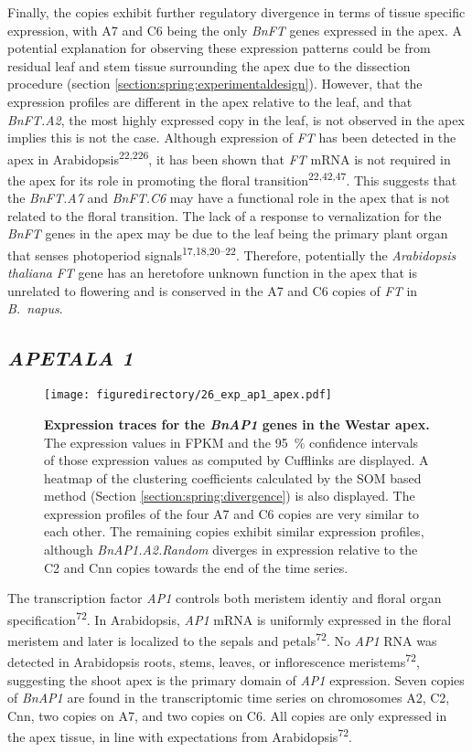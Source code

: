 \documentclass[12pt,]{book}
\begin{document}
Finally, the copies exhibit further regulatory divergence in terms of
tissue specific expression, with A7 and C6 being the only \emph{BnFT}
genes expressed in the apex. A potential explanation for observing these
expression patterns could be from residual leaf and stem tissue
surrounding the apex due to the dissection procedure (section
\ref{section:spring:experimentaldesign}). However, that the expression
profiles are different in the apex relative to the leaf, and that
\emph{BnFT.A2}, the most highly expressed copy in the leaf, is not
observed in the apex implies this is not the case. Although expression
of \emph{FT} has been detected in the apex in
Arabidopsis\textsuperscript{22,226}, it has been shown that \emph{FT}
mRNA is not required in the apex for its role in promoting the floral
transition\textsuperscript{22,42,47}. This suggests that the
\emph{BnFT.A7} and \emph{BnFT.C6} may have a functional role in the apex
that is not related to the floral transition. The lack of a response to
vernalization for the \emph{BnFT} genes in the apex may be due to the
leaf being the primary plant organ that senses photoperiod
signals\textsuperscript{17,18,20--22}. Therefore, potentially the
\emph{Arabidopsis thaliana} \emph{FT} gene has an heretofore unknown
function in the apex that is unrelated to flowering and is conserved in
the A7 and C6 copies of \emph{FT} in \emph{B.~napus}.

\subsection{\texorpdfstring{\emph{APETALA
1}}{APETALA 1}}\label{section:spring:ap1}

\begin{figure}[htbp]
\centering
\texttt{[image: figuredirectory/26\_exp\_ap1\_apex.pdf]}
\caption{\textbf{Expression traces for the \emph{BnAP1} genes in the
Westar apex.} The expression values in FPKM and the 95~\% confidence
intervals of those expression values as computed by Cufflinks are
displayed. A heatmap of the clustering coefficients calculated by the
SOM based method (Section \ref{section:spring:divergence}) is also
displayed. The expression profiles of the four A7 and C6 copies are very
similar to each other. The remaining copies exhibit similar expression
profiles, although \emph{BnAP1.A2.Random} diverges in expression
relative to the C2 and Cnn copies towards the end of the time
series.}\label{figure:226:ap1apex}
\end{figure}

The transcription factor \emph{AP1} controls both meristem identiy and
floral organ specification\textsuperscript{72}. In Arabidopsis,
\emph{AP1} mRNA is uniformly expressed in the floral meristem and later
is localized to the sepals and petals\textsuperscript{72}. No \emph{AP1}
RNA was detected in Arabidopsis roots, stems, leaves, or inflorescence
meristems\textsuperscript{72}, suggesting the shoot apex is the primary
domain of \emph{AP1} expression. Seven copies of \emph{BnAP1} are found
in the transcriptomic time series on chromosomes A2, C2, Cnn, two copies
on A7, and two copies on C6. All copies are only expressed in the apex
tissue, in line with expectations from Arabidopsis\textsuperscript{72}.
\end{document}
